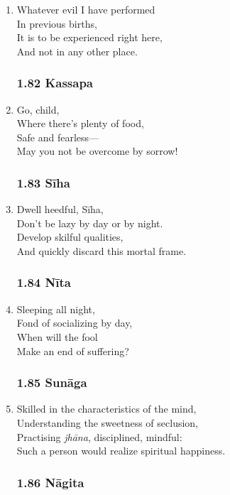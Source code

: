 \documentclass[10pt, openany]{book}
\begin{document}
\begin{enumerate}
\item Whatever evil I have performed\\
In previous births,\\
It is to be experienced right here,\\
And not in any other place.

\subsubsection*{1.82 Kassapa}

\item Go, child,\\
Where there’s plenty of food,\\
Safe and fearless—\\
May you not be overcome by sorrow!

\subsubsection*{1.83 Sīha}

\item Dwell heedful, Sīha,\\
Don’t be lazy by day or by night.\\
Develop skilful qualities,\\
And quickly discard this mortal frame.

\subsubsection*{1.84 Nīta}

\item Sleeping all night,\\
Fond of socializing by day,\\
When will the fool\\
Make an end of suffering?

\subsubsection*{1.85 Sunāga}

\item Skilled in the characteristics of the mind,\\
Understanding the sweetness of seclusion,\\
Practising \emph{jhāna}, disciplined, mindful:\\
Such a person would realize spiritual happiness.

\subsubsection*{1.86 Nāgita}


\end{enumerate}
\end{document}
